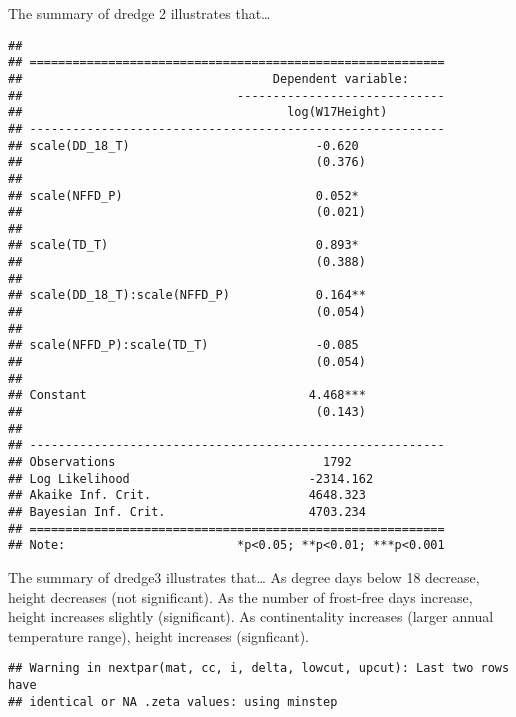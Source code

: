 \documentclass[]{article}
\begin{document}
The summary of dredge 2 illustrates that\ldots{}

\begin{verbatim}
## 
## ==========================================================
##                                   Dependent variable:     
##                              -----------------------------
##                                     log(W17Height)        
## ----------------------------------------------------------
## scale(DD_18_T)                          -0.620            
##                                         (0.376)           
##                                                           
## scale(NFFD_P)                           0.052*            
##                                         (0.021)           
##                                                           
## scale(TD_T)                             0.893*            
##                                         (0.388)           
##                                                           
## scale(DD_18_T):scale(NFFD_P)            0.164**           
##                                         (0.054)           
##                                                           
## scale(NFFD_P):scale(TD_T)               -0.085            
##                                         (0.054)           
##                                                           
## Constant                               4.468***           
##                                         (0.143)           
##                                                           
## ----------------------------------------------------------
## Observations                             1792             
## Log Likelihood                         -2314.162          
## Akaike Inf. Crit.                      4648.323           
## Bayesian Inf. Crit.                    4703.234           
## ==========================================================
## Note:                        *p<0.05; **p<0.01; ***p<0.001
\end{verbatim}

The summary of dredge3 illustrates that\ldots{} As degree days below 18
decrease, height decreases (not significant). As the number of
frost-free days increase, height increases slightly (significant). As
continentality increases (larger annual temperature range), height
increases (signficant).

\begin{verbatim}
## Warning in nextpar(mat, cc, i, delta, lowcut, upcut): Last two rows have
## identical or NA .zeta values: using minstep
\end{verbatim}
\end{document}
